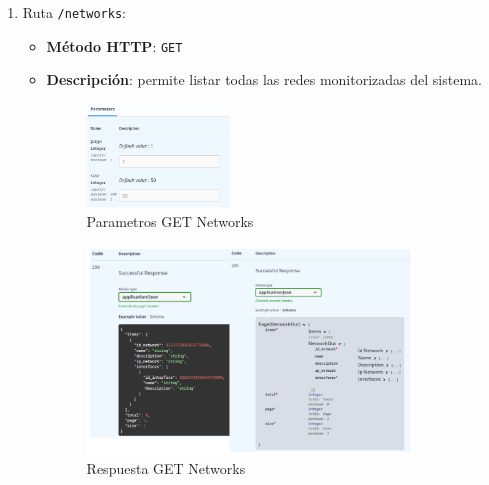 \documentclass[a4paper, oneside, 12pt]{book}
\begin{document}
	\begin{enumerate}
		\item Ruta \texttt{/networks}:
		
		\begin{itemize}
			\item \textbf{Método HTTP}: \texttt{GET}
			\item \textbf{Descripción}: permite listar todas las redes monitorizadas del sistema.
			
			\begin{figure}[h!]
				\begin{center}
					\includegraphics[width=0.38\textwidth]{img/parameters_get_networks.png}
					\caption{Parametros GET Networks}
					\label{img: parameters get networks}
				\end{center}
			\end{figure}
			
			\begin{figure}[h!]
				\begin{center}
					\includegraphics[width=0.87\textwidth]{diag/response_get_networks.png}
					\caption{Respuesta GET Networks}
					\label{img: response get networks}
				\end{center}
			\end{figure}
		
		\end{itemize}
	
		\pagebreak
	

\end{enumerate}
\end{document}
